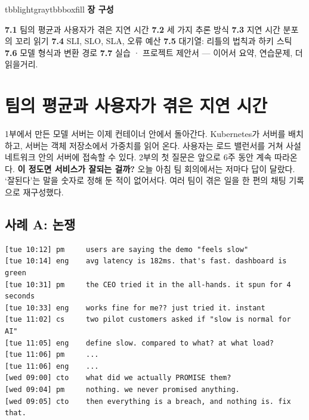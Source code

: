\vspace{3.5pt}

\begin{calloutbox}{tbblightgray}{tbbboxfill}
{\normalsize\bfseries\color{tbbink}장 구성}\par\vspace{3pt}
\textbf{7.1} 팀의 평균과 사용자가 겪은 지연 시간    \textbf{7.2} 세 가지 추론 방식    \textbf{7.3} 지연 시간 분포의 꼬리 읽기    \textbf{7.4} SLI, SLO, SLA, 오류 예산    \textbf{7.5} 대기열: 리틀의 법칙과 하키 스틱    \textbf{7.6} 모델 형식과 변환 경로    \textbf{7.7} 실습 · 프로젝트 제안서 — 이어서 요약, 연습문제, 더 읽을거리.
\end{calloutbox}

\section{팀의 평균과 사용자가 겪은 지연 시간}

1부에서 만든 모델 서버는 이제 컨테이너 안에서 돌아간다. Kubernetes가 서버를 배치하고, 서버는 객체 저장소에서 가중치를 읽어 온다. 사용자는 로드 밸런서를 거쳐 사설 네트워크 안의 서버에 접속할 수 있다. 2부의 첫 질문은 앞으로 6주 동안 계속 따라온다. \textbf{이 정도면 서비스가 잘되는 걸까?} 오늘 아침 팀 회의에서는 저마다 답이 달랐다. ‘잘된다’는 말을 숫자로 정해 둔 적이 없어서다. 여러 팀이 겪은 일을 한 편의 채팅 기록으로 재구성했다.

\subsection*{사례 A: 논쟁}

\begin{terminalbox}
\begin{Verbatim}[breaklines=true,breakanywhere=true,fontsize=\small,formatcom=\color{tbbtermfg},codes=\tbbcodeactive]
[tue 10:12] pm     users are saying the demo "feels slow"
[tue 10:14] eng    avg latency is 182ms. that's fast. dashboard is green
[tue 10:31] pm     the CEO tried it in the all-hands. it spun for 4 seconds
[tue 10:33] eng    works fine for me?? just tried it. instant
[tue 11:02] cs     two pilot customers asked if "slow is normal for AI"
[tue 11:05] eng    define slow. compared to what? at what load?
[tue 11:06] pm     ...
[tue 11:06] eng    ...
[wed 09:00] cto    what did we actually PROMISE them?
[wed 09:04] pm     nothing. we never promised anything.
[wed 09:05] cto    then everything is a breach, and nothing is. fix that.
\end{Verbatim}
\end{terminalbox}

